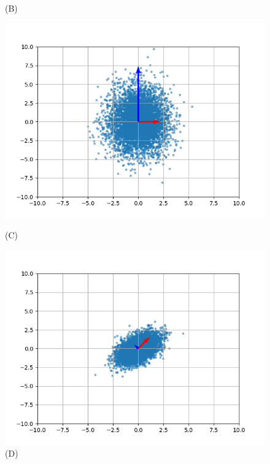 \documentclass{article}
\begin{document}
\begin{figure}[!htb]
\begin{minipage}{0.24\textwidth}
                \caption{(B)}
        \end{minipage}
        \begin{minipage}{0.24\textwidth}
        \centering
                \includegraphics[width=1\linewidth]{../Cov_2.png}
                \caption{(C)}
        \end{minipage}\hfill
        \begin{minipage}{0.24\textwidth}
                \centering
                \includegraphics[width=1\linewidth]{../Cov_3.png}
                \caption{(D)}
        \end{minipage}
\end{figure}
\end{document}
